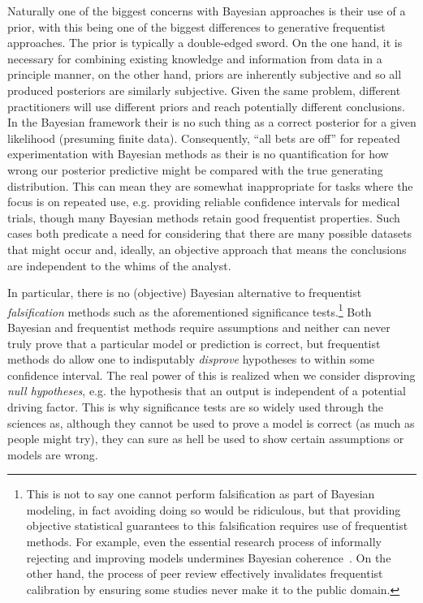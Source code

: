Naturally one of the biggest concerns with Bayesian approaches is their use of a prior, with this being
one of the biggest differences to generative frequentist approaches.  The prior is typically a double-edged
sword.  On the one hand, it is necessary for combining existing knowledge and information from data 
in a principle manner, on the other hand, priors are inherently subjective and so all produced posteriors are
similarly subjective.  Given the same problem, different practitioners will use different priors and reach
potentially different conclusions.  In the Bayesian framework their is no such thing
as a correct posterior for a given likelihood (presuming finite data).
Consequently, ``all bets are off'' for repeated experimentation with Bayesian methods as their is no
quantification for how wrong our posterior predictive might be compared with the true generating
distribution.  This can mean they  are somewhat inappropriate for tasks where the focus is on repeated use,
e.g. providing reliable confidence intervals for medical trials, though many Bayesian methods retain
good frequentist properties.  Such cases both predicate a need for
considering that there are many possible datasets that might occur and, ideally, an objective approach
that means the conclusions are independent to the whims of the analyst.

In particular, there is no (objective) Bayesian alternative to frequentist
\emph{falsification} methods such as the aforementioned significance tests.\footnote{This is not to say one cannot 
	perform falsification as part of Bayesian modeling, in fact avoiding doing so would
	be ridiculous, but that providing objective statistical guarantees to this falsification requires use of
	frequentist methods.  For example, even the essential research process of informally
	rejecting and improving models undermines Bayesian coherence~\citep{gelman2011induction}.  On the other hand, the
	process of peer review effectively
	invalidates frequentist calibration by ensuring some studies never make it to the public domain.}
  Both Bayesian and frequentist methods require assumptions
and neither can never truly prove that a particular model or prediction is correct, but frequentist methods do
allow one to indisputably \emph{disprove} hypotheses to within some confidence interval.  The real power
of this is realized when we consider disproving \emph{null hypotheses}, e.g. the hypothesis that an
output is independent of a potential driving factor.  This is why significance tests are so widely
used through the sciences as, although they cannot be used to prove
a model is correct (as much as people might try), they can sure as hell be used to show 
certain assumptions or models are wrong.

